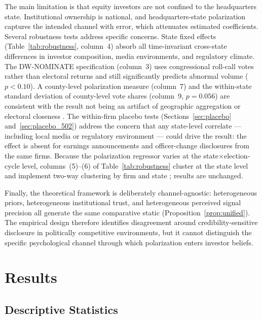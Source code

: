\documentclass[12pt]{article}
\begin{document}
The main limitation is that equity investors are not confined to the
headquarters state. Institutional ownership is national, and
headquarters-state polarization captures the intended channel with error,
which attenuates estimated coefficients. Several robustness tests address
specific concerns.
State fixed effects (Table~\ref{tab:robustness}, column~4) absorb all
time-invariant cross-state differences in investor composition, media
environments, and regulatory climate. The DW-NOMINATE specification
(column~3) uses congressional roll-call votes rather than electoral
returns and still significantly predicts abnormal volume ($p < 0.10$).
A county-level polarization measure (column~7) and the within-state
standard deviation of county-level vote shares (column~9, $p = 0.056$)
are consistent with the result not being an artifact of geographic
aggregation or electoral closeness \citep{fiorina2005}. The within-firm
placebo tests
(Sections~\ref{sec:placebo} and~\ref{sec:placebo_502}) address the
concern that any state-level correlate --- including local media or
regulatory environment --- could drive the result: the effect is absent
for earnings announcements and officer-change disclosures from the same
firms. Because the polarization regressor varies at the
state$\times$election-cycle level, columns~(5)--(6) of
Table~\ref{tab:robustness} cluster at the state level and implement
two-way clustering by firm and state \citep{cameron2011}; results are
unchanged.

Finally, the theoretical framework is deliberately channel-agnostic:
heterogeneous priors, heterogeneous institutional trust, and heterogeneous
perceived signal precision all generate the same comparative static
(Proposition~\ref{prop:unified}). The empirical design therefore identifies
disagreement around credibility-sensitive disclosure in politically
competitive environments, but it cannot distinguish the specific
psychological channel through which polarization enters investor beliefs.


\section{Results}
\label{sec:results}

\subsection{Descriptive Statistics}
\end{document}
